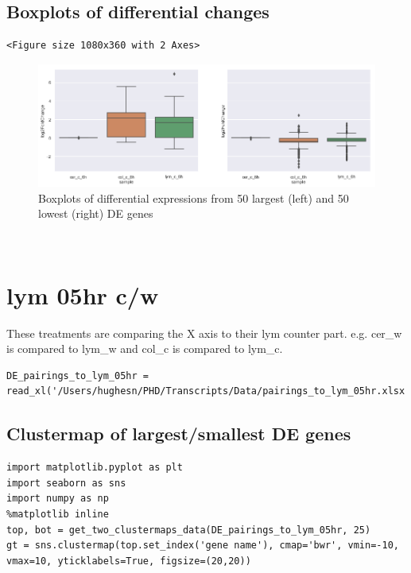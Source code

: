 \documentclass[11pt]{article}
\begin{document}
\subsection{Boxplots of differential changes}
\label{sec:org981bdaa}

\begin{verbatim}
<Figure size 1080x360 with 2 Axes>
\end{verbatim}


\begin{figure}[htbp]
\centering
\includegraphics[width=.9\linewidth]{obipy-resources/pairings_6hr_boxplots.png}
\caption{\label{pairings_6hr_boxplots}
Boxplots of differential expressions from 50 largest (left) and 50 lowest (right) DE genes}
\end{figure}



\clearpage\\
\section{lym 05hr c/w}
\label{sec:orgd14ed54}

These treatments are comparing the X axis to their lym counter part. e.g. cer\_w is compared to lym\_w and col\_c is compared to lym\_c.\\

\begin{verbatim}
DE_pairings_to_lym_05hr = read_xl('/Users/hughesn/PHD/Transcripts/Data/pairings_to_lym_05hr.xlsx')
\end{verbatim}

\subsection{Clustermap of largest/smallest DE genes}
\label{sec:orga1800e1}

\begin{verbatim}
import matplotlib.pyplot as plt
import seaborn as sns
import numpy as np
%matplotlib inline
top, bot = get_two_clustermaps_data(DE_pairings_to_lym_05hr, 25)
gt = sns.clustermap(top.set_index('gene name'), cmap='bwr', vmin=-10, vmax=10, yticklabels=True, figsize=(20,20))
\end{verbatim}
\end{document}
